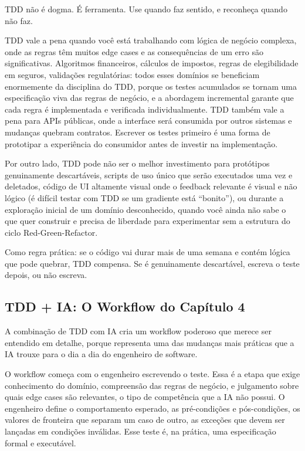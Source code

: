 TDD não é dogma. É ferramenta. Use quando faz sentido, e reconheça quando não
faz.

TDD vale a pena quando você está trabalhando com lógica de negócio complexa,
onde as regras têm muitos edge cases e as consequências de um erro são
significativas. Algoritmos financeiros, cálculos de impostos, regras de
elegibilidade em seguros, validações regulatórias: todos esses domínios se
beneficiam enormemente da disciplina do TDD, porque os testes acumulados se
tornam uma especificação viva das regras de negócio, e a abordagem incremental
garante que cada regra é implementada e verificada individualmente. TDD também
vale a pena para APIs públicas, onde a interface será consumida por outros
sistemas e mudanças quebram contratos. Escrever os testes primeiro é uma forma
de prototipar a experiência do consumidor antes de investir na implementação.

Por outro lado, TDD pode não ser o melhor investimento para protótipos
genuinamente descartáveis, scripts de uso único que serão executados uma vez e
deletados, código de UI altamente visual onde o feedback relevante é visual e
não lógico (é difícil testar com TDD se um gradiente está ``bonito''), ou
durante a exploração inicial de um domínio desconhecido, quando você ainda não
sabe o que quer construir e precisa de liberdade para experimentar sem a
estrutura do ciclo Red-Green-Refactor.

Como regra prática: se o código vai durar mais de uma semana e contém lógica
que pode quebrar, TDD compensa. Se é genuinamente descartável, escreva o teste
depois, ou não escreva.

\subsection{TDD + IA: O Workflow do Capítulo 4}

A combinação de TDD com IA cria um workflow poderoso que merece ser entendido
em detalhe, porque representa uma das mudanças mais práticas que a IA trouxe
para o dia a dia do engenheiro de software.

O workflow começa com o engenheiro escrevendo o teste. Essa é a etapa que exige
conhecimento do domínio, compreensão das regras de negócio, e julgamento sobre
quais edge cases são relevantes, o tipo de competência que a IA
não possui. O engenheiro define o comportamento esperado, as pré-condições e
pós-condições, os valores de fronteira que separam um caso de outro, as exceções
que devem ser lançadas em condições inválidas. Esse teste é, na prática, uma
especificação formal e executável.

